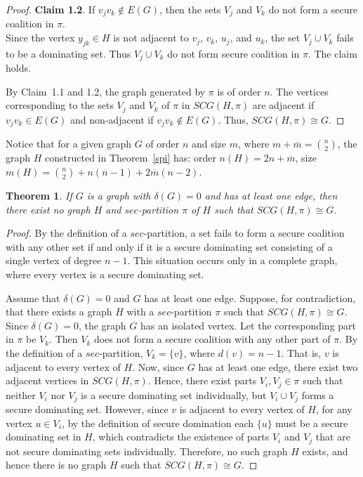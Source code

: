 \documentclass[12pt]{article}
\newtheorem{theorem}{Theorem}[section]
\begin{document}
\begin{proof}
\textbf{Claim 1.2}. If $v_jv_k \notin E(G)$, then the sets $V_j$ and $V_k$ do not form a secure coalition in $\pi$.\\[2mm]
 Since the vertex $y_{jk}\in H$ is not adjacent to $v_j$, $v_k$, $u_j$, and $u_k$, the set $V_j \cup V_k$ fails to be a dominating set. Thus $V_j\cup V_k$ do not form secure coalition in $\pi$. The claim holds.\par
 By Claim~1.1 and 1.2, the graph generated by $\pi$ is of order $n$. The vertices corresponding to the sets $V_j$ and $V_k$ of $\pi$ in $SCG(H,\pi)$ are adjacent if $v_jv_k\in E(G)$ and non-adjacent if $v_jv_k\not \in E(G)$. Thus, $SCG(H,\pi)\cong G$.
\end{proof}
Notice that for a given graph $G$ of order $n$ and size $m$, where $m+\overline{m}=\binom{n}{2}$, the graph $H$ constructed in Theorem~\ref{spi} has: order $n(H)=2n+\overline{m}$, size $m(H)=\binom{n}{2}+n(n-1)+2\overline{m}(n-2)$.
\begin{theorem}
If $G$ is a graph with $\delta(G)=0$ and has at least one edge, then there exist no graph $H$ and $sec$-partition $\pi$ of $H$ such that $SCG(H,\pi) \cong G$.
\end{theorem}
\begin{proof}
By the definition of a $sec$-partition, a set fails to form a secure coalition with any other set if and only if it is a secure dominating set consisting of a single vertex of degree $n-1$. This situation occurs only in a complete graph, where every vertex is a secure dominating set.\par Assume that $\delta(G) = 0$ and $G$ has at least one edge. Suppose, for contradiction, that there exists a graph $H$ with a $sec$-partition $\pi$ such that
$SCG(H,\pi) \cong G$. Since $\delta(G) = 0$, the graph $G$ has an isolated vertex. Let the corresponding part in $\pi$ be $V_k$. Then $V_k$ does not form a secure coalition with any other part of $\pi$. By the definition of a $sec$-partition, $V_k = \{v\}$, where $d(v)=n-1$. That is, $v$ is adjacent to every vertex of $H$. Now, since $G$ has at least one edge, there exist two adjacent vertices in $SCG(H,\pi)$. Hence, there exist parts $V_i, V_j \in \pi$ such that neither $V_i$ nor $V_j$ is a secure dominating set individually, but $V_i \cup V_j$ forms a secure dominating set. However, since $v$ is adjacent to every vertex of $H$, for any vertex $u \in V_i$, by the definition of secure domination each $\{u\}$ must be a secure dominating set in $H$, which contradicts the existence of parts $V_i$ and $V_j$ that are not secure dominating sets individually.
Therefore, no such graph $H$ exists, and hence there is no graph $H$ such that $SCG(H,\pi) \cong G$.
\end{proof}
\end{document}
